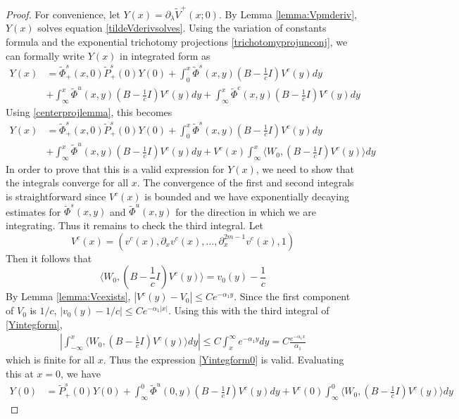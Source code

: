 \documentclass[thesis.tex]{subfiles}
\begin{document}
\begin{lemma}
\begin{enumerate}[(i)]
\end{enumerate}
\begin{proof}
For convenience, let $Y(x) = \partial_\lambda \tilde{V}^+(x; 0)$. By Lemma \ref{lemma:Vpmderiv}, $Y(x)$ solves equation \cref{tildeVderivsolves}. Using the variation of constants formula and the exponential trichotomy projections \cref{trichotomyprojunconj}, we can formally write $Y(x)$ in integrated form as
\begin{equation*}
\begin{aligned}
Y(x) &= \tilde{\Phi}^s_+(x,0)\tilde{P}^s_+(0) Y(0) 
+ \int_0^x \tilde{\Phi}^s(x,y)\left( B - \frac{1}{c}I \right) V^c(y) dy \\
&+ \int_{\infty}^x \tilde{\Phi}^u(x,y)\left( B - \frac{1}{c}I \right) V^c(y) dy + \int_{\infty}^x \tilde{\Phi}^c(x,y)\left( B - \frac{1}{c}I \right) V^c(y) dy 
\end{aligned}
\end{equation*}
Using \cref{centerprojlemma}, this becomes
\begin{equation}\label{Yintegform}
\begin{aligned}
Y(x) &= \tilde{\Phi}^s_+(x,0)\tilde{P}^s_+(0) Y(0) 
+ \int_0^x \tilde{\Phi}^s(x,y)\left( B - \frac{1}{c}I \right) V^c(y) dy \\
&+ \int_{\infty}^x \tilde{\Phi}^u(x,y)\left( B - \frac{1}{c}I \right) V^c(y) dy + V^c(x) \int_{\infty}^x \langle W_0, \left( B - \frac{1}{c}I \right) V^c(y) \rangle dy 
\end{aligned}
\end{equation}
In order to prove that this is a valid expression for $Y(x)$, we need to show that the integrals converge for all $x$. The convergence of the first and second integrals is straightforward since $V^c(x)$ is bounded and we have exponentially decaying estimates for $\tilde{\Phi}^s(x,y)$ and $\tilde{\Phi}^u(x,y)$ for the direction in which we are integrating. Thus it remains to check the third integral. Let 
\[
V^c(x) = (v^c(x), \partial_x v^c(x), \dots, \partial_x^{2m-1} v^c(x), 1)
\]
Then it follows that
\[
\langle W_0, \left( B - \frac{1}{c}I \right) V^c(y) \rangle = v_0(y) - \frac{1}{c}
\]
By Lemma \cref{lemma:Vcexists}, $|V^c(y) - V_0|\leq Ce^{-\alpha_1 y}$. Since the first component of $V_0$ is $1/c$, $|v_0(y) - 1/c| \leq Ce^{-\alpha_1 |x|}$. Using this with the third integral of \cref{Yintegform}, 
\begin{align*}
\left| \int_{-\infty}^x \langle W_0, \left( B - \frac{1}{c}I \right) V^c(y) \rangle dy \right| 
\leq C \int_x^{\infty} e^{-\alpha_1 y} dy = C \frac{e^{-\alpha_1 x}}{\alpha_1}
\end{align*}
which is finite for all $x$. Thus the expression \cref{Yintegform0} is valid. Evaluating this at $x = 0$, we have
\begin{equation}\label{Yintegform0}
\begin{aligned}
Y(0) &= \tilde{P}^s_+(0) Y(0) 
+ \int_{\infty}^0 \tilde{\Phi}^u(0,y)\left( B - \frac{1}{c}I \right) V^c(y) dy + V^c(0) \int_{\infty}^0 \langle W_0, \left( B - \frac{1}{c}I \right) V^c(y) \rangle dy 
\end{aligned}
\end{equation}


\end{proof}
\end{lemma}
\end{document}
